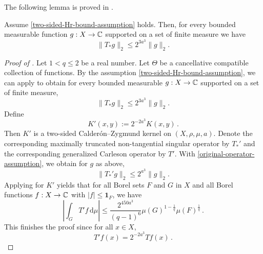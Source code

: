 The following lemma is proved in .
\begin{lemma}\label{nontangential-from-simple}
    \leanok
    Assume \eqref{two-sided-Hr-bound-assumption} holds.
    Then, for every bounded measurable function $g : X \to \mathbb{C}$ supported on a set of finite measure we have
    \begin{equation}\label{concretetstarbound}
        \|T_*g\|_2\le 2^{3a^3}\|g\|_2.
    \end{equation}
\end{lemma}

\begin{proof}[Proof of ]
    \leanok
    Let $1<q\le 2$ be a real number. Let $\Theta$ be a cancellative compatible collection of functions.
    By the assumption \eqref{two-sided-Hr-bound-assumption}, we can apply  to obtain for every bounded measurable $g:X\to\mathbb{C}$ supported on a set of finite measure,
    \begin{equation}\label{original-operator-assumption}
        \|T_*g\|_2\le 2^{3a^3}\|g\|_2.
    \end{equation}
    Define
    \begin{equation*}
        K'(x,y):= 2^{-2a^3} K(x,y) \,.
    \end{equation*}
    Then $K'$ is a two-sided Calder\'on--Zygmund kernel on $(X,\rho,\mu,a)$. Denote the corresponding maximally truncated non-tangential singular operator by $T_*'$ and the corresponding generalized Carleson operator by $T'$.
    With \eqref{original-operator-assumption}, we obtain for $g$ as above,
    \begin{equation}\label{modified-operator-assumption}
        \|T_*'g\|_2\le 2^{a^3}\|g\|_2.
    \end{equation}
    Applying  for $K'$ yields that for all Borel sets $F$ and $G$ in $X$ and
    all Borel functions $f:X\to \mathbb{C}$ with
    $|f|\le \mathbf{1}_F$, we have
    \begin{equation*}
        \left|\int_{G} T' f \, \mathrm{d}\mu\right| \leq \frac{2^{450a^3}}{(q-1)^6} \mu(G)^{1-\frac{1}{q}} \mu(F)^{\frac{1}{q}}\, .
    \end{equation*}
    This finishes the proof since for all $x\in X$,
    \begin{equation*}
        T'f(x) = 2^{-2a^3} Tf(x) \,.
    \end{equation*}
\end{proof}

